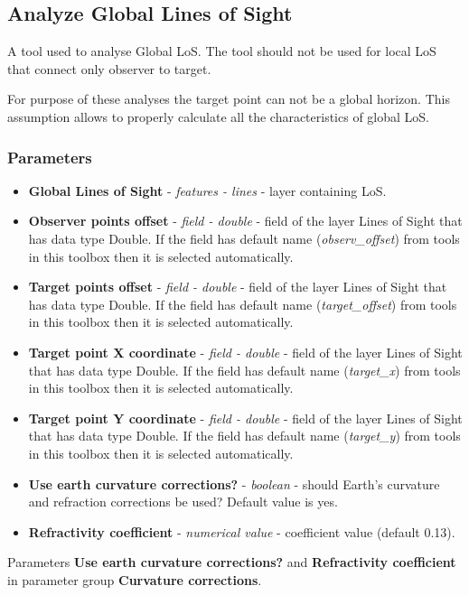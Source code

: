 \documentclass[]{article}
\begin{document}
\subsection{Analyze Global Lines of Sight}

A tool used to analyse Global LoS. The tool should not be used for local LoS that connect only observer to target.

For purpose of these analyses the target point can not be a global horizon. This assumption allows to properly calculate all the characteristics of global LoS.

\subsubsection{Parameters}
\begin{itemize}
	\item \textbf{Global Lines of Sight} - \textit{features - lines} - layer containing LoS.
	\item \textbf{Observer points offset} - \textit{field - double} - field of the layer Lines of Sight that has data type Double. If the field has default name (\textit{observ\_offset}) from tools in this toolbox then it is selected automatically.
	\item \textbf{Target points offset} - \textit{field - double} - field of the layer Lines of Sight that has data type Double. If the field has default name (\textit{target\_offset}) from tools in this toolbox then it is selected automatically.
	\item \textbf{Target point X coordinate} - \textit{field - double} - field of the layer Lines of Sight that has data type Double. If the field has default name (\textit{target\_x}) from tools in this toolbox then it is selected automatically.
	\item \textbf{Target point Y coordinate} - \textit{field - double} - field of the layer Lines of Sight that has data type Double. If the field has default name (\textit{target\_y}) from tools in this toolbox then it is selected automatically.
	\item \textbf{Use earth curvature corrections?} - \textit{boolean} - should Earth's curvature and refraction corrections be used? Default value is yes.
	\item \textbf{Refractivity coefficient} - \textit{numerical value}  - coefficient value (default 0.13).
\end{itemize}

Parameters \textbf{Use earth curvature corrections?} and \textbf{Refractivity coefficient} in parameter group \textbf{Curvature corrections}.
\end{document}
